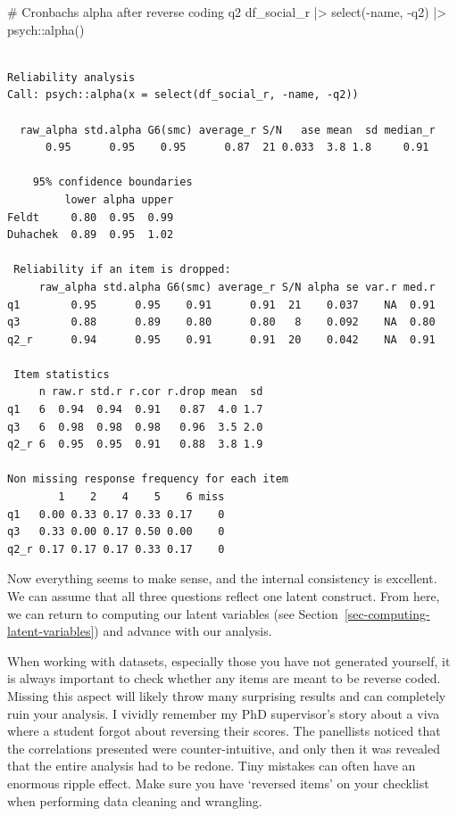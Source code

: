 \documentclass[
  letterpaper,
]{krantz}
\makeatletter
\newenvironment{Shaded}{\begin{snugshade}}{\end{snugshade}}
\newcommand{\CommentTok}[1]{\textcolor[rgb]{0.37,0.37,0.37}{#1}}
\newcommand{\FunctionTok}[1]{\textcolor[rgb]{0.28,0.35,0.67}{#1}}
\newcommand{\NormalTok}[1]{\textcolor[rgb]{0.00,0.23,0.31}{#1}}
\newcommand{\SpecialCharTok}[1]{\textcolor[rgb]{0.37,0.37,0.37}{#1}}
\newenvironment{kframe}{%
\medskip{}
\setlength{\fboxsep}{.8em}
 \def\at@end@of@kframe{}%
 \ifinner\ifhmode%
  \def\at@end@of@kframe{\end{minipage}}%
  \begin{minipage}{\columnwidth}%
 \fi\fi%
 \def\FrameCommand##1{\hskip\@totalleftmargin \hskip-\fboxsep
 \colorbox{shadecolor}{##1}\hskip-\fboxsep
     \hskip-\linewidth \hskip-\@totalleftmargin \hskip\columnwidth}%
 \MakeFramed {\advance\hsize-\width
   \@totalleftmargin\z@ \linewidth\hsize
   \@setminipage}}%
 {\par\unskip\endMakeFramed%
 \at@end@of@kframe}
\renewenvironment{Shaded}{\begin{kframe}}{\end{kframe}}
\makeatother
\begin{document}
\begin{Shaded}
\begin{Highlighting}[]
\CommentTok{\# Cronbach\textquotesingle{}s alpha after reverse coding q2}
\NormalTok{df\_social\_r }\SpecialCharTok{|\textgreater{}}
  \FunctionTok{select}\NormalTok{(}\SpecialCharTok{{-}}\NormalTok{name, }\SpecialCharTok{{-}}\NormalTok{q2) }\SpecialCharTok{|\textgreater{}}
\NormalTok{  psych}\SpecialCharTok{::}\FunctionTok{alpha}\NormalTok{()}
\end{Highlighting}
\end{Shaded}

\begin{verbatim}

Reliability analysis   
Call: psych::alpha(x = select(df_social_r, -name, -q2))

  raw_alpha std.alpha G6(smc) average_r S/N   ase mean  sd median_r
      0.95      0.95    0.95      0.87  21 0.033  3.8 1.8     0.91

    95% confidence boundaries 
         lower alpha upper
Feldt     0.80  0.95  0.99
Duhachek  0.89  0.95  1.02

 Reliability if an item is dropped:
     raw_alpha std.alpha G6(smc) average_r S/N alpha se var.r med.r
q1        0.95      0.95    0.91      0.91  21    0.037    NA  0.91
q3        0.88      0.89    0.80      0.80   8    0.092    NA  0.80
q2_r      0.94      0.95    0.91      0.91  20    0.042    NA  0.91

 Item statistics 
     n raw.r std.r r.cor r.drop mean  sd
q1   6  0.94  0.94  0.91   0.87  4.0 1.7
q3   6  0.98  0.98  0.98   0.96  3.5 2.0
q2_r 6  0.95  0.95  0.91   0.88  3.8 1.9

Non missing response frequency for each item
        1    2    4    5    6 miss
q1   0.00 0.33 0.17 0.33 0.17    0
q3   0.33 0.00 0.17 0.50 0.00    0
q2_r 0.17 0.17 0.17 0.33 0.17    0
\end{verbatim}

Now everything seems to make sense, and the internal consistency is
excellent. We can assume that all three questions reflect one latent
construct. From here, we can return to computing our latent variables
(see Section~\ref{sec-computing-latent-variables}) and advance with our
analysis.

When working with datasets, especially those you have not generated
yourself, it is always important to check whether any items are meant to
be reverse coded. Missing this aspect will likely throw many surprising
results and can completely ruin your analysis. I vividly remember my PhD
supervisor's story about a viva where a student forgot about reversing
their scores. The panellists noticed that the correlations presented
were counter-intuitive, and only then it was revealed that the entire
analysis had to be redone. Tiny mistakes can often have an enormous
ripple effect. Make sure you have `reversed items' on your checklist
when performing data cleaning and wrangling.
\end{document}
